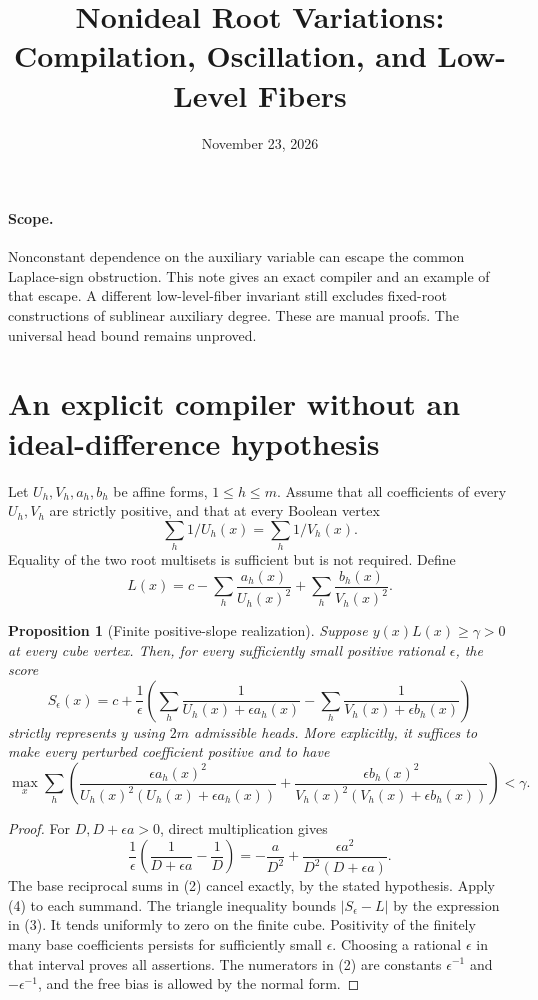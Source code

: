 \documentclass[11pt]{article}
\title{Nonideal Root Variations: Compilation, Oscillation, and Low-Level Fibers}
\author{}
\date{November 23, 2026}
\newtheorem{proposition}[theorem]{Proposition}
\begin{document}
\maketitle

\paragraph{Scope.}
Nonconstant dependence on the auxiliary variable can escape the common
Laplace-sign obstruction. This note gives an exact compiler and an
example of that escape. A different low-level-fiber invariant still
excludes fixed-root constructions of sublinear auxiliary degree.
These are manual proofs. The universal head bound remains unproved.

\section{An explicit compiler without an ideal-difference hypothesis}

Let $U_h,V_h,a_h,b_h$ be affine forms, $1\le h\le m$.
Assume that all coefficients of every $U_h,V_h$ are strictly positive,
and that at every Boolean vertex
\[
                         \sum_h 1/U_h(x)=\sum_h 1/V_h(x).
\]
Equality of the two root multisets is sufficient but is not required.
Define
\[
 L(x)=c-\sum_h\frac{a_h(x)}{U_h(x)^2}
          +\sum_h\frac{b_h(x)}{V_h(x)^2}.
 \tag{1}
\]

\begin{proposition}[Finite positive-slope realization]
Suppose $y(x)L(x)\ge\gamma>0$ at every cube vertex. Then, for every
sufficiently small positive rational $\epsilon$, the score
\[
 S_\epsilon(x)=c+\frac1\epsilon
       \left(\sum_h\frac1{U_h(x)+\epsilon a_h(x)}
                  -\sum_h\frac1{V_h(x)+\epsilon b_h(x)}\right)
 \tag{2}
\]
strictly represents $y$ using $2m$ admissible heads. More explicitly,
it suffices to make every perturbed coefficient positive and to have
\[
 \max_x\sum_h\left(
 \frac{\epsilon a_h(x)^2}{U_h(x)^2(U_h(x)+\epsilon a_h(x))}
 +\frac{\epsilon b_h(x)^2}{V_h(x)^2(V_h(x)+\epsilon b_h(x))}
                  \right)<\gamma.
 \tag{3}
\]
\end{proposition}
\begin{proof}
For $D,D+\epsilon a>0$, direct multiplication gives
\[
 \frac1\epsilon\left(\frac1{D+\epsilon a}-\frac1D\right)
       =-\frac a{D^2}
                    +\frac{\epsilon a^2}{D^2(D+\epsilon a)}.
 \tag{4}
\]
The base reciprocal sums in (2) cancel exactly, by the stated
hypothesis. Apply (4) to each summand. The triangle inequality bounds
$|S_\epsilon-L|$ by the expression in (3). It tends uniformly to zero
on the finite cube. Positivity of the finitely many base coefficients
persists for sufficiently small $\epsilon$. Choosing a rational
$\epsilon$ in that interval proves all assertions. The numerators in
(2) are constants $\epsilon^{-1}$ and $-\epsilon^{-1}$, and the free
bias is allowed by the normal form.
\end{proof}
\end{document}
